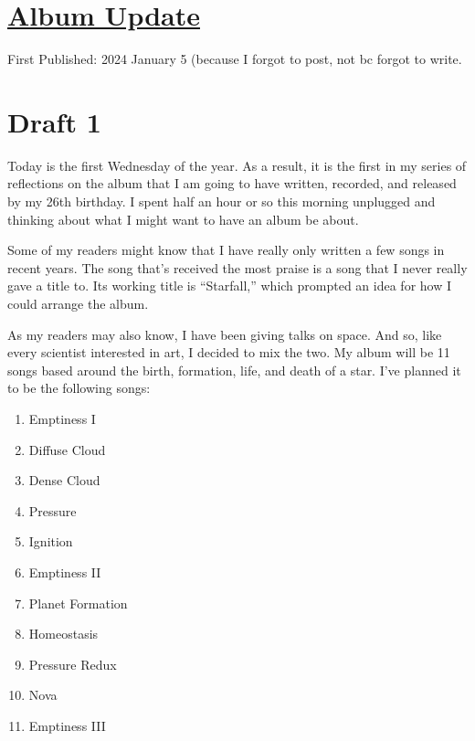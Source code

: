 \documentclass[12pt]{article}[titlepage]
\newcommand{\say}[1]{``#1''}
\renewcommand{\,}{\textsuperscript{,}}
\begin{document}
\doublespacing
\section{\href{album-update-24-01-03.html}{Album Update}}
First Published: 2024 January 5 (because I forgot to post, not bc forgot to write.

\section{Draft 1}
Today is the first Wednesday of the year.
As a result, it is the first in my series\endnotemark[1] of reflections on the album that I am going to have written, recorded, and released by my 26th birthday.\endnotemark[3]
I spent half an hour or so this morning unplugged and thinking about what I might want to have an album be about.

Some of my readers might know that I have really only written a few songs in recent years.\endnotemark[4]
The song that's received the most praise is a song that I never really gave a title to.
Its working title is\endnotemark[5] \say{Starfall,} which prompted an idea for how I could arrange the album.

As my readers may also know, I have been\endnotemark[6] giving talks on space.
And so, like every scientist interested in art, I decided to mix the two.
My album will be 11 songs based around the birth, formation, life, and death of a star.
I've planned it to be the following songs:

\begin{enumerate}
\item Emptiness I
\item Diffuse Cloud
\item Dense Cloud
\item Pressure
\item Ignition
\item Emptiness II
\item Planet Formation
\item Homeostasis
\item Pressure Redux
\item Nova
\item Emptiness III
\end{enumerate}
\end{document}
